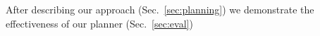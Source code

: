 \documentclass[conference]{IEEEtran}
\begin{document}
After describing our approach (Sec.~\ref{sec:planning}) we demonstrate the effectiveness of our planner (Sec.~\ref{sec:eval})



%
%
%
%
%
% 
%
%
%
\end{document}
